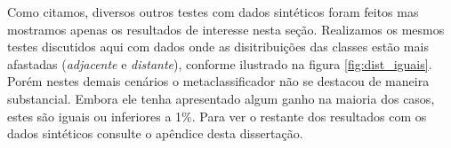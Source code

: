 Como citamos, diversos outros testes com dados sintéticos foram feitos mas mostramos apenas os resultados de interesse nesta seção.
Realizamos os mesmos testes discutidos aqui com dados onde as disitribuições das classes estão mais afastadas (\textit{adjacente} e \textit{distante}), conforme ilustrado na figura \ref{fig:dist_iguais}.
Porém nestes demais cenários o metaclassificador não se destacou de maneira substancial.
Embora ele tenha apresentado algum ganho na maioria dos casos, estes são iguais ou inferiores a 1\%.
Para ver o restante dos resultados com os dados sintéticos consulte o apêndice desta dissertação.
